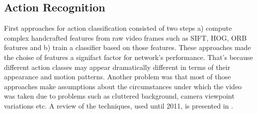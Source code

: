 \subsection{Action Recognition}
First approaches for action classification consisted of two steps a) compute complex handcrafted features from raw video frames
such as SIFT, HOG, ORB features and b) train a classifier based on those features. These approaches made the choise of
features a signifact factor for network's performance. That's because different action classes may appear dramatically
different in terms of their appearance and motion patterns. Another problem was that most of those approaches make
assumptions about the circumstances under which the video was taken due to problems such as cluttered
background, camera viewpoint variations etc. A review of the techniques, used until 2011, is presented in \cite{Aggarwal:2011:HAA:1922649.1922653}. \par

